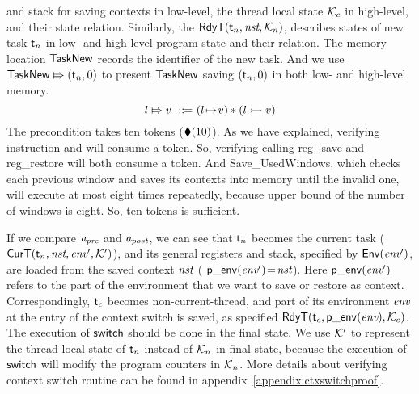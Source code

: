 and stack for saving contexts in low-level, 
the thread local state $\mathcal{K}_c$ in high-level, 
and their state relation. 
Similarly, the $\textsf{RdyT}({\textsf{t}_n}, {\textit{nst}}, {\mathcal{K}_n})$, 
describes states of new task $\textsf{t}_n$ in low- and high-level 
program state and their relation. The memory location 
$\mathsf{TaskNew}$ records the identifier of the new task.  
And we use ${\mathsf{TaskNew}}\Mapsto{(\textsf{t}_n, 0)}$ to present 
$\mathsf{TaskNew}$ saving $(\textsf{t}_n, 0)$ 
in both low- and high-level memory. 
\[
    \relmsto{\loc}{\val} \ \define \ 
    (\msto{\loc}{\val}) \sepstar (\hmsto{\loc}{\val})
\]
The precondition takes ten tokens ($\blacklozenge({10})$). 
As we have explained, verifying instruction \call{} 
and \jmp{} will consume a token. So, verifying calling 
\textsf{reg\_save} and \textsf{reg\_restore} will 
both consume a token. And \textsf{Save\_UsedWindows}, 
which checks each previous window 
and saves its contexts into memory until the invalid one, 
will execute at most eight times repeatedly, 
because upper bound of 
the number of windows is eight. So, ten tokens is sufficient. 

If we compare $\textit{a}_\textit{pre}$ and $\textit{a}_\textit{post}$, we can see that
$\textsf{t}_n$ becomes the current task
($\textsf{CurT}({\textsf{t}_n}, {\textit{nst}}, {\textit{env}'}, {\mathcal{K}'})$),
and its general registers and stack, specified by
$\mathsf{Env}({\textit{env}'})$, are loaded from the saved context
$\textit{nst}$ (\ie{} $\mathsf{p\_env}({\textit{env}'})\!=\!\textit{nst}$).
Here $\mathsf{p\_env}({\textit{env}'})$ refers to the part of the environment
that we want to save or restore as context.
Correspondingly, $\textsf{t}_c$ becomes non-current-thread,
and part of its environment $\textit{env}$ at the entry of
the context switch is saved, as specified
$\textsf{RdyT}({\textsf{t}_c}, {\mathsf{p\_env}({\textit{env}})}, {\mathcal{K}_c})$. 
The execution of $\mathsf{switch}$ should be done in the final state. 
We use $\mathcal{K}'$ to represent the thread local 
state of $\textsf{t}_n$ instead of $\mathcal{K}_n$ in final state, 
because the execution of $\mathsf{switch}$ will modify the program counters 
in $\mathcal{K}_n$. More details about verifying 
context switch routine can be found in 
appendix~\ref{appendix:ctxswitchproof}. 